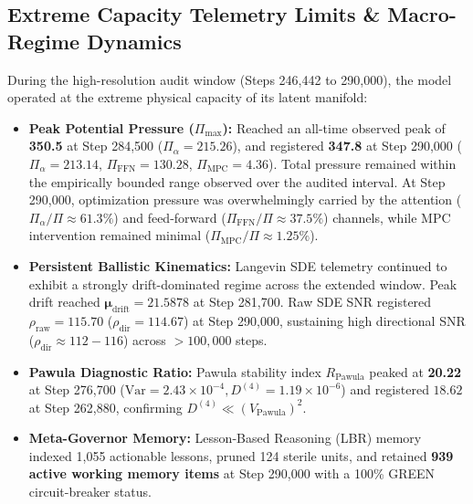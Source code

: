 \documentclass[11pt]{article}
\begin{document}
\subsection{Extreme Capacity Telemetry Limits \& Macro-Regime Dynamics}
During the high-resolution audit window (Steps 246,442 to 290,000), the model operated at the extreme physical capacity of its latent manifold:
\begin{itemize}
    \item \textbf{Peak Potential Pressure ($\Pi_{\max}$):} Reached an all-time observed peak of \textbf{350.5} at Step 284,500 ($\Pi_\alpha = 215.26$), and registered \textbf{347.8} at Step 290,000 ($\Pi_\alpha = 213.14$, $\Pi_{\text{FFN}} = 130.28$, $\Pi_{\text{MPC}} = 4.36$). Total pressure remained within the empirically bounded range observed over the audited interval. At Step 290,000, optimization pressure was overwhelmingly carried by the attention ($\Pi_\alpha / \Pi \approx 61.3\%$) and feed-forward ($\Pi_{\text{FFN}} / \Pi \approx 37.5\%$) channels, while MPC intervention remained minimal ($\Pi_{\text{MPC}} / \Pi \approx 1.25\%$).
    \item \textbf{Persistent Ballistic Kinematics:} Langevin SDE telemetry continued to exhibit a strongly drift-dominated regime across the extended window. Peak drift reached $\boldsymbol{\mu}_{\text{drift}} = \mathbf{21.5878}$ at Step 281,700. Raw SDE SNR registered $\rho_{\text{raw}} = \mathbf{115.70}$ ($\rho_{\text{dir}} = 114.67$) at Step 290,000, sustaining high directional SNR ($\rho_{\text{dir}} \approx 112 - 116$) across $>100,000$ steps.
    \item \textbf{Pawula Diagnostic Ratio:} Pawula stability index $R_{\text{Pawula}}$ peaked at \textbf{20.22} at Step 276,700 ($\text{Var} = 2.43 \times 10^{-4}, D^{(4)} = 1.19 \times 10^{-6}$) and registered $18.62$ at Step 262,880, confirming $D^{(4)} \ll (V_{\mathrm{Pawula}})^2$.
    \item \textbf{Meta-Governor Memory:} Lesson-Based Reasoning (LBR) memory indexed 1,055 actionable lessons, pruned 124 sterile units, and retained \textbf{939 active working memory items} at Step 290,000 with a 100\% \textsf{GREEN} circuit-breaker status.
\end{itemize}
\end{document}
